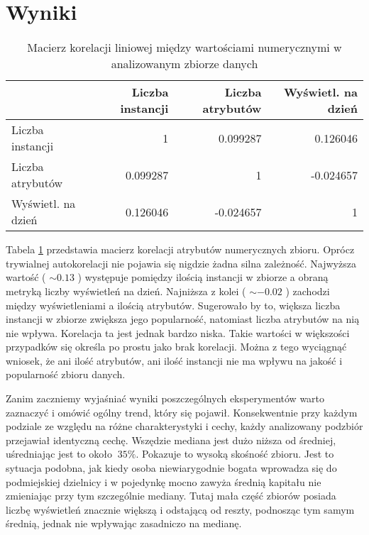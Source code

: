 \section{Wyniki}

\begin{center}
      \begin{table}[ht]
        \begin{tabular}{|l|rrr|}
          \hline
                              & Liczba instancji & Liczba atrybutów & Wyświetl. na dzień \\
          \hline
          Liczba instancji    & 1                & 0.099287         & 0.126046           \\
          Liczba atrybutów    & 0.099287         & 1                & -0.024657          \\
          Wyświetl. na dzień  & 0.126046         & -0.024657        & 1                  \\
          \hline
        \end{tabular}
        \caption{Macierz korelacji liniowej między wartościami numerycznymi w analizowanym zbiorze danych}
        \label{tab:correlation}
      \end{table}
    \end{center}

Tabela \ref{tab:correlation} przedstawia macierz korelacji atrybutów numerycznych zbioru.
Oprócz trywialnej autokorelacji nie pojawia się nigdzie żadna silna zależność.
Najwyższa wartość ( \( \sim 0.13 \) ) występuje pomiędzy ilością instancji w zbiorze a obraną metryką liczby wyświetleń na dzień.
Najniższa z kolei ( \( \sim -0.02 \) ) zachodzi między wyświetleniami a ilością atrybutów.
Sugerowało by to, większa liczba instancji w zbiorze zwiększa jego popularność, natomiast liczba atrybutów na nią nie wpływa.
Korelacja ta jest jednak bardzo niska.
Takie wartości w większości przypadków się określa po prostu jako brak korelacji.
Można z tego wyciągnąć wniosek, że ani ilość atrybutów, ani ilość instancji nie ma wpływu na jakość i popularność zbioru danych.

Zanim zaczniemy wyjaśniać wyniki poszczególnych eksperymentów warto zaznaczyć i omówić ogólny trend, który się pojawił.
Konsekwentnie przy każdym podziale ze względu na różne charakterystyki i cechy, każdy analizowany podzbiór przejawiał identyczną cechę.
Wszędzie mediana jest dużo niższa od średniej, uśredniając jest to około \( ~ 35\% \).
Pokazuje to wysoką skośność zbioru.
Jest to sytuacja podobna, jak kiedy osoba niewiarygodnie bogata wprowadza się do podmiejskiej dzielnicy i w pojedynkę mocno zawyża średnią kapitału nie zmieniając przy tym szczególnie mediany.
Tutaj mała część zbiorów posiada liczbę wyświetleń znacznie większą i odstającą od reszty, podnosząc tym samym średnią, jednak nie wpływając zasadniczo na medianę.

